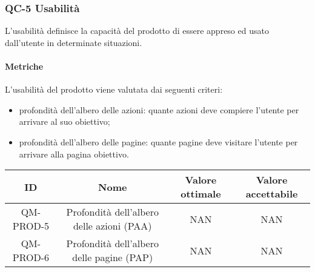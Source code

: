 \subsubsection{QC-5 Usabilità}
L'usabilità definisce la capacità del prodotto di essere appreso ed usato dall'utente in determinate situazioni.

	\paragraph{Metriche}
	L'usabilità del prodotto viene valutata dai seguenti criteri:
	\begin{itemize}
		\item profondità dell'albero delle azioni: quante azioni deve compiere l'utente per arrivare al suo obiettivo;
		\item profondità dell'albero delle pagine: quante pagine deve visitare l'utente per arrivare alla pagina obiettivo.
	\end{itemize}
	\begin{center}
		\begin{tabular}{|c|c|c|c|}
			\rowcolor{lighter-grayer}
			\hline
			ID & Nome & Valore ottimale & Valore accettabile \\
			\hline
			QM-PROD-5 & Profondità dell'albero delle azioni (PAA) & NAN & NAN \\
			\hline
			QM-PROD-6 & Profondità dell'albero delle pagine (PAP) & NAN & NAN \\
			\hline
		\end{tabular}
	\end{center}
